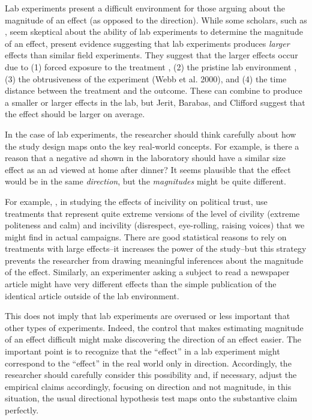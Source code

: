 \documentclass[12pt]{article}
\begin{document}
\begin{appendix}

Lab experiments present a difficult environment for those arguing about the magnitude of an effect (as opposed to the direction). While some scholars, such as \cite{Gerber2011}, seem skeptical about the ability of lab experiments to determine the magnitude of an effect, \cite{JeritBarabasClifford2013} present evidence suggesting that lab experiments produces \textit{larger} effects than similar field experiments. They suggest that the larger effects occur due to (1) forced exposure to the treatment \citep{GainesKuklinski2011}, (2) the pristine lab environment \citep{Kinder2007}, (3) the obtrusiveness of the experiment (Webb et al. 2000), and (4) the time distance between the treatment and the outcome. These can combine to produce a smaller or larger effects in the lab, but Jerit, Barabas, and Clifford suggest that the effect should be larger on average.

In the case of lab experiments, the researcher should think carefully about how the study design maps onto the key real-world concepts. For example, is there a reason that a negative ad shown in the laboratory should have a similar size effect as an ad viewed at home after dinner? It seems plausible that the effect would be in the same \emph{direction}, but the \emph{magnitudes} might be quite different.

For example, \cite{MutzReeves2005}, in studying the effects of incivility on political trust, use treatments that represent quite extreme versions of the level of civility (extreme politeness and calm) and incivility (disrespect, eye-rolling, raising voices) that we might find in actual campaigns. There are good statistical reasons to rely on treatments with large effects--it increases the power of the study--but this strategy prevents the researcher from drawing meaningful inferences about the magnitude of the effect. Similarly, an experimenter asking a subject to read a newspaper article might have very different effects than the simple publication of the identical article outside of the lab environment.

This does not imply that lab experiments are overused or less important that other types of experiments. Indeed, the control that makes estimating magnitude of an effect difficult might make discovering the direction of an effect easier. The important point is to recognize that the ``effect'' in a lab experiment might correspond to the ``effect'' in the real world only in direction. Accordingly, the researcher should carefully consider this possibility and, if necessary, adjust the empirical claims accordingly, focusing on direction and not magnitude, in this situation, the usual directional hypothesis test maps onto the substantive claim perfectly.


\end{appendix}
\end{document}

